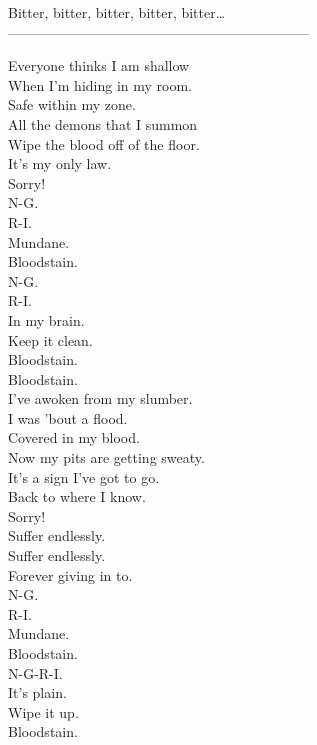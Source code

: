 Bitter, bitter, bitter, bitter, bitter… \\

-----------------------------------------------------------------



Everyone thinks I am shallow \\
When I'm hiding in my room. \\
Safe within my zone. \\

All the demons that I summon \\
Wipe the blood off of the floor. \\
It's my only law. \\

Sorry! \\

N-G. \\
R-I. \\
Mundane. \\
Bloodstain. \\
N-G. \\
R-I. \\
In my brain. \\
Keep it clean. \\
Bloodstain. \\

Bloodstain. \\

I've awoken from my slumber. \\
I was  'bout a flood. \\
Covered in my blood. \\

Now my pits are getting sweaty. \\
It's a sign I've got to go. \\
Back to where I know. \\

Sorry! \\

Suffer endlessly. \\
Suffer endlessly. \\
Forever giving in to. \\

N-G. \\
R-I. \\
Mundane. \\
Bloodstain. \\
N-G-R-I. \\
It's plain. \\
Wipe it up. \\
Bloodstain. \\

